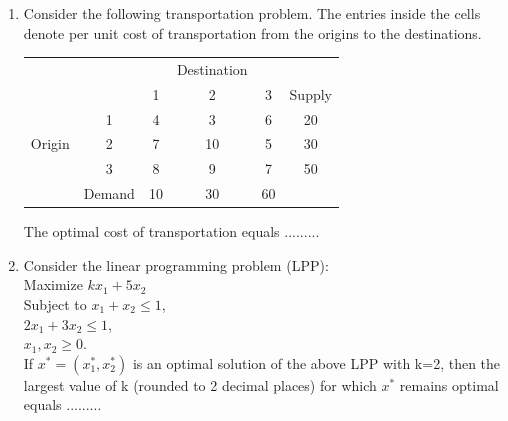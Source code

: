 \documentclass[journal,12pt,twocolumn]{IEEEtran}
\begin{document}
\begin{enumerate}
\item Consider the following transportation problem. The entries inside the cells denote per unit cost of transportation from the origins to the destinations.
\begin{table}[!h]
\begin{center}
\begin{tabular}{c c c c c c}
& & & Destination & & \\
& & 1 & 2 & 3 & Supply \\
& 1 & 4 & 3 & 6 & 20 \\
Origin & 2 & 7 & 10 & 5 & 30 \\
& 3 & 8 & 9 & 7 & 50 \\
& Demand & 10 & 30 & 60 & 
\end{tabular}
\end{center}
\end{table}
The optimal cost of transportation equals .........

\item Consider the linear programming problem (LPP): \\
Maximize $kx_1 \! + \! 5x_2$\\
Subject to $x_1 \! + \! x_2 \! \leqslant \! 1$, \\
$2x_1 \! + \! 3x_2 \! \leqslant \! 1$, \\
$x_1, \! x_2 \! \geqslant \! 0$.\\
\smallskip
If $x^* \! = \! (x_1^*, \! x_2^*)$ is an optimal solution of the above LPP with k=2, then the largest value of k (rounded to 2 decimal places) for which $x^*$ remains optimal equals .........

\end{enumerate}
\end{document}
